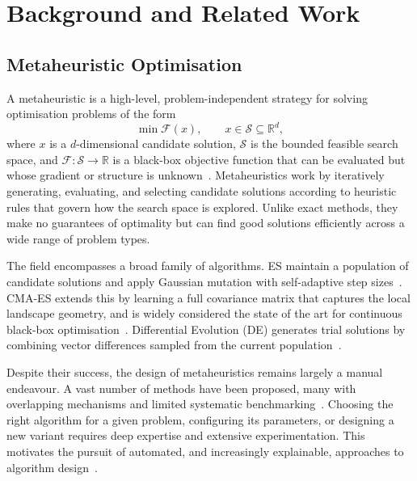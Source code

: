 
\chapter{Background and Related Work}
\label{ch:background}

\section{Metaheuristic Optimisation}
\label{sec:bg-metaheuristics}

A metaheuristic is a high-level, problem-independent strategy for solving optimisation problems of the form
\[
  \min \mathcal{F}(x), \qquad x \in \mathcal{S} \subseteq \mathbb{R}^d,
\]
where $x$ is a $d$-dimensional candidate solution, $\mathcal{S}$ is the bounded feasible search space, and $\mathcal{F}: \mathcal{S} \to \mathbb{R}$ is a black-box objective function that can be evaluated but whose gradient or structure is unknown~\cite{sorensen2013metaheuristics}. Metaheuristics work by iteratively generating, evaluating, and selecting candidate solutions according to heuristic rules that govern how the search space is explored. Unlike exact methods, they make no guarantees of optimality but can find good solutions efficiently across a wide range of problem types.

The field encompasses a broad family of algorithms. ES maintain a population of candidate solutions and apply Gaussian mutation with self-adaptive step sizes~\cite{back1996evolutionary}. CMA-ES extends this by learning a full covariance matrix that captures the local landscape geometry, and is widely considered the state of the art for continuous black-box optimisation~\cite{hansen2001cmaes}. Differential Evolution (DE) generates trial solutions by combining vector differences sampled from the current population~\cite{storn1997de}.

Despite their success, the design of metaheuristics remains largely a manual endeavour. A vast number of methods have been proposed, many with overlapping mechanisms and limited systematic benchmarking~\cite{aranha2022metaphor}. Choosing the right algorithm for a given problem, configuring its parameters, or designing a new variant requires deep expertise and extensive experimentation. This motivates the pursuit of automated, and increasingly explainable, approaches to algorithm design~\cite{vanStein2025Explainable}.

